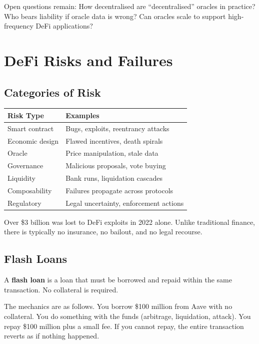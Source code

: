 \documentclass[11pt,a4paper]{article}
\newcommand{\keyword}[1]{\textbf{\textcolor{AccentOrange}{#1}}}
\begin{document}
Open questions remain: How decentralised are ``decentralised'' oracles in practice? Who bears liability if oracle data is wrong? Can oracles scale to support high-frequency DeFi applications?

\section{DeFi Risks and Failures}

\subsection{Categories of Risk}

\begin{center}
\begin{tabular}{lp{8cm}}
\toprule
\textbf{Risk Type} & \textbf{Examples} \\
\midrule
Smart contract & Bugs, exploits, reentrancy attacks \\
Economic design & Flawed incentives, death spirals \\
Oracle & Price manipulation, stale data \\
Governance & Malicious proposals, vote buying \\
Liquidity & Bank runs, liquidation cascades \\
Composability & Failures propagate across protocols \\
Regulatory & Legal uncertainty, enforcement actions \\
\bottomrule
\end{tabular}
\end{center}

Over \$3 billion was lost to DeFi exploits in 2022 alone. Unlike traditional finance, there is typically no insurance, no bailout, and no legal recourse.

\subsection{Flash Loans}

A \keyword{flash loan} is a loan that must be borrowed and repaid within the same transaction. No collateral is required.

The mechanics are as follows. You borrow \$100 million from Aave with no collateral. You do something with the funds (arbitrage, liquidation, attack). You repay \$100 million plus a small fee. If you cannot repay, the entire transaction reverts as if nothing happened.
\end{document}
